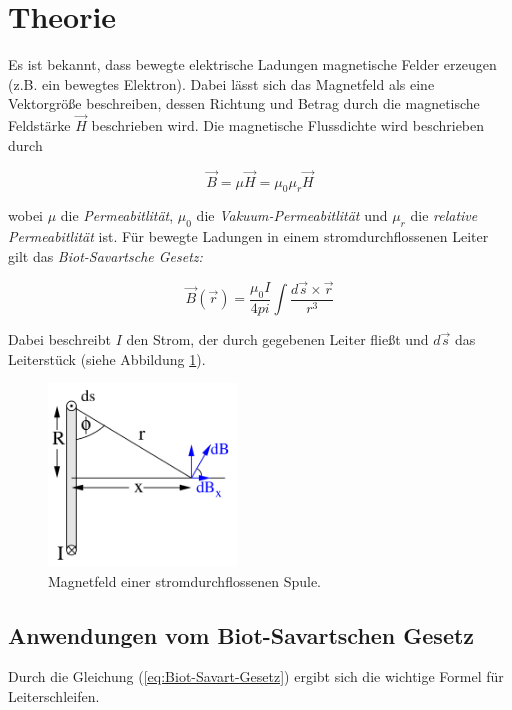 \section{Theorie}
\label{sec:Theorie}

Es ist bekannt, dass bewegte elektrische Ladungen magnetische Felder erzeugen (z.B. ein bewegtes Elektron).
Dabei lässt sich das Magnetfeld als eine Vektorgröße beschreiben, dessen Richtung und Betrag durch die magnetische Feldstärke $\vec{H}$ beschrieben wird.
Die magnetische Flussdichte wird beschrieben durch

\begin{equation} \label{eq:Flussdichte}
    \vec{B} = \mu \vec{H} = \mu_{0} \mu_{r} \vec{H}
\end{equation}

wobei $\mu$ die \textit{Permeabitlität}, $\mu_{0}$ die \textit{Vakuum-Permeabitlität} und $\mu_{r}$ die \textit{relative Permeabitlität} ist.
Für bewegte Ladungen in einem stromdurchflossenen Leiter gilt das \textit{Biot-Savartsche Gesetz:}

\begin{equation} \label{eq:Biot-Savart-Gesetz}
    \vec{B}(\vec{r}) = \frac{\mu_{0}I}{4pi} \int \frac{d\vec{s} \times \vec{r}}{r^3}
\end{equation}

Dabei beschreibt $I$ den Strom, der durch gegebenen Leiter fließt und $d\vec{s}$ das Leiterstück (siehe Abbildung \ref{fig:BiotSavart1}).
\begin{figure} 
    \centering
    \includegraphics[width=5cm] {pictures/BiotSavart1.png}  
    \caption{Magnetfeld einer stromdurchflossenen Spule. \cite{v308}}
    \label{fig:BiotSavart1}
\end{figure} 

\subsection{Anwendungen vom Biot-Savartschen Gesetz}

Durch die Gleichung (\ref{eq:Biot-Savart-Gesetz}) ergibt sich die wichtige Formel für Leiterschleifen.

